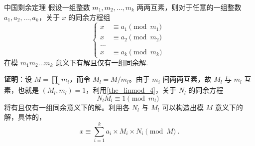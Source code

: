 
\begin{theorem}{中国剩余定理}
假设一组整数 $m_1, m_2, \dots, m_k$ 两两互素，则对于任意的一组整数 $a_1, a_2, \dots, a_k$，关于 $x$ 的同余方程组
\begin{equation}\left\{
\begin{aligned}
x &\equiv a_1 \pmod{m_1} \\
x &\equiv a_2 \pmod{m_2} \\
\dots   \\
x &\equiv a_k \pmod{m_k}
\end{aligned}\right. ~~
\end{equation}
在模 $m_1m_2\dots m_k$ 意义下有解且仅有一组同余解.
\end{theorem}
\textbf{证明}：设 $M = \prod_i m_i$，而令 $M_l = M / m_l$。由于 $m_i$ 间两两互素，故 $M_l$ 与 $m_l$ 互素，也就是 $(M_l, m_l) = 1$，利用\autoref{the_linmod_4}，关于 $N_l$ 的同余方程
\begin{equation}
N_l M_l \equiv 1 \pmod{m_l} ~~
\end{equation}
将有且仅有一组同余意义下的解。利用各 $N_l$ 与 $M_l$ 可以构造出模 $M$ 意义下的解，具体的，
\begin{equation}
x \equiv  \sum_{i=1}^k a_i \times M_i \times N_i \pmod{M} ~.
\end{equation}
